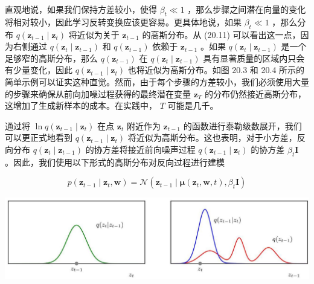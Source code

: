 \documentclass[10pt]{report}
\begin{document}
直观地说，如果我们保持方差较小，使得 \({\beta }_{t} \ll  1\) ，那么步骤之间潜在向量的变化将相对较小，因此学习反转变换应该更容易。更具体地说，如果 \({\beta }_{t} \ll  1\) ，那么分布 \(q\left( {{\mathbf{z}}_{t - 1} \mid  {\mathbf{z}}_{t}}\right)\) 将近似为关于 \({\mathbf{z}}_{t - 1}\) 的高斯分布。从 (20.11) 可以看出这一点，因为右侧通过 \(q\left( {{\mathbf{z}}_{t} \mid  {\mathbf{z}}_{t - 1}}\right)\) 和 \(q\left( {\mathbf{z}}_{t - 1}\right)\) 依赖于 \({\mathbf{z}}_{t - 1}\) 。如果 \(q\left( {{\mathbf{z}}_{t} \mid  {\mathbf{z}}_{t - 1}}\right)\) 是一个足够窄的高斯分布，那么 \(q\left( {\mathbf{z}}_{t - 1}\right)\) 在 \(q\left( {{\mathbf{z}}_{t} \mid  {\mathbf{z}}_{t - 1}}\right)\) 具有显著质量的区域内只会有少量变化，因此 \(q\left( {{\mathbf{z}}_{t - 1} \mid  {\mathbf{z}}_{t}}\right)\) 也将近似为高斯分布。如图 20.3 和 20.4 所示的简单示例可以证实这种直觉。然而，由于每个步骤的方差较小，我们必须使用大量的步骤来确保从前向加噪过程获得的最终潜在变量 \({\mathbf{z}}_{T}\) 的分布仍然接近高斯分布，这增加了生成新样本的成本。在实践中， \(T\) 可能是几千。

通过将 \(\ln q\left( {{\mathbf{z}}_{t - 1} \mid  {\mathbf{z}}_{t}}\right)\) 在点 \({\mathbf{z}}_{t}\) 附近作为 \({\mathbf{z}}_{t - 1}\) 的函数进行泰勒级数展开，我们可以更正式地看到 \(q\left( {{\mathbf{z}}_{t - 1} \mid  {\mathbf{z}}_{t}}\right)\) 将近似为高斯分布。这也表明，对于小方差，反向分布 \(q\left( {{\mathbf{z}}_{t} \mid  {\mathbf{z}}_{t - 1}}\right)\) 的协方差将接近前向噪声过程 \(q\left( {{\mathbf{z}}_{t - 1} \mid  {\mathbf{z}}_{t}}\right)\) 的协方差 \({\beta }_{t}\mathbf{I}\) 。因此，我们使用以下形式的高斯分布对反向过程进行建模

\[
p\left( {{\mathbf{z}}_{t - 1} \mid  {\mathbf{z}}_{t},\mathbf{w}}\right)  = \mathcal{N}\left( {{\mathbf{z}}_{t - 1} \mid  \mathbf{\mu }\left( {{\mathbf{z}}_{t},\mathbf{w},t}\right) ,{\beta }_{t}\mathbf{I}}\right)  \tag{20.18}
\]

\begin{center}
\includegraphics[max width=1.0\textwidth]{images/0194e279-9b28-703a-88f4-c3ac21e2010d_605_244_1517_1301_348_0.jpg}
\end{center}
\hspace*{3em} 
\end{document}
